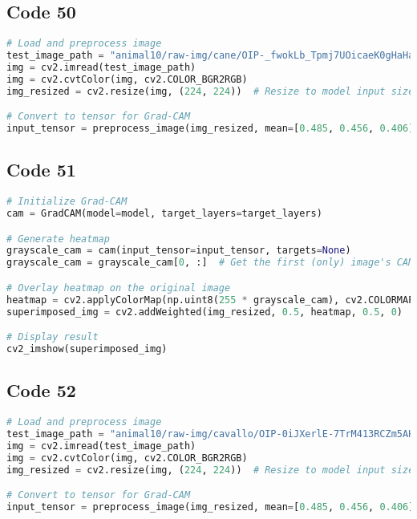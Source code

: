 \documentclass{article}
\begin{document}
\subsection*{Code 50}
\begin{lstlisting}[language=Python]
# Load and preprocess image
test_image_path = "animal10/raw-img/cane/OIP-_fwokLb_Tpmj7UOicaeK0gHaHa.jpeg"  # Change path to an actual image
img = cv2.imread(test_image_path)
img = cv2.cvtColor(img, cv2.COLOR_BGR2RGB)
img_resized = cv2.resize(img, (224, 224))  # Resize to model input size

# Convert to tensor for Grad-CAM
input_tensor = preprocess_image(img_resized, mean=[0.485, 0.456, 0.406], std=[0.229, 0.224, 0.225])
\end{lstlisting}

\subsection*{Code 51}
\begin{lstlisting}[language=Python]
# Initialize Grad-CAM
cam = GradCAM(model=model, target_layers=target_layers)

# Generate heatmap
grayscale_cam = cam(input_tensor=input_tensor, targets=None)
grayscale_cam = grayscale_cam[0, :]  # Get the first (only) image's CAM

# Overlay heatmap on the original image
heatmap = cv2.applyColorMap(np.uint8(255 * grayscale_cam), cv2.COLORMAP_JET)
superimposed_img = cv2.addWeighted(img_resized, 0.5, heatmap, 0.5, 0)

# Display result
cv2_imshow(superimposed_img)
\end{lstlisting}

\subsection*{Code 52}
\begin{lstlisting}[language=Python]
# Load and preprocess image
test_image_path = "animal10/raw-img/cavallo/OIP-0iJXerlE-7TrM413RCZm5AHaEK.jpeg"  # Change path to an actual image
img = cv2.imread(test_image_path)
img = cv2.cvtColor(img, cv2.COLOR_BGR2RGB)
img_resized = cv2.resize(img, (224, 224))  # Resize to model input size

# Convert to tensor for Grad-CAM
input_tensor = preprocess_image(img_resized, mean=[0.485, 0.456, 0.406], std=[0.229, 0.224, 0.225])
\end{lstlisting}
\end{document}
